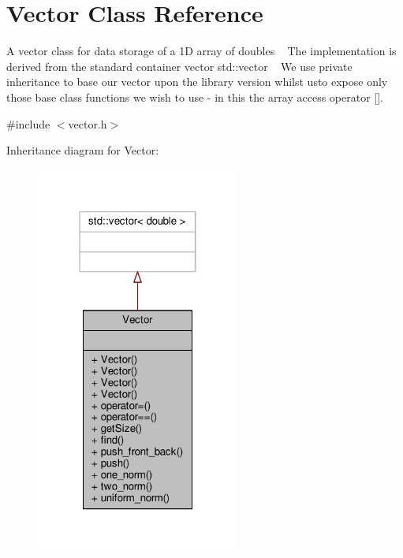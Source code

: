 \hypertarget{classVector}{}\section{Vector Class Reference}
\label{classVector}


A vector class for data storage of a 1D array of doubles ~\newline
 The implementation is derived from the standard container vector std\+::vector ~\newline
 We use private inheritance to base our vector upon the library version whilst  usto expose only those base class functions we wish to use -\/ in this  the array access operator \mbox{[}\mbox{]}.  




{\ttfamily \#include $<$vector.\+h$>$}



Inheritance diagram for Vector\+:
\nopagebreak
\begin{figure}[H]
\begin{center}
\leavevmode
\includegraphics[width=190pt]{classVector__inherit__graph}
\end{center}
\end{figure}



